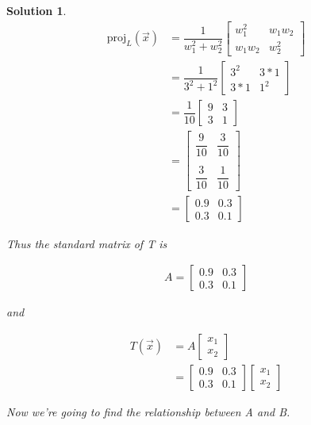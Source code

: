 \documentclass{article}
\newtheorem*{solution}{Solution}
\newcommand{\Proj}[2]{\mathrm{proj}_{#1}(\vec{#2})}
\begin{document}
\begin{solution}
\begin{align*}
\Proj{L}{x} &= \dfrac{1}{w_{1}^2 + w_{2}^2} \begin{bmatrix} w_{1}^2 & w_{1}w_{2} \\ w_{1}w_{2} & w_{2}^2 \end{bmatrix} \\
&= \dfrac{1}{3^2 + 1^2} \begin{bmatrix} 3^2 & 3*1 \\ 3*1 & 1^2 \end{bmatrix} \\
&= \dfrac{1}{10} \begin{bmatrix} 9 & 3 \\ 3 & 1 \end{bmatrix} \\
&= \begin{bmatrix} \dfrac{9}{10} & \dfrac{3}{10} \\ \\ \dfrac{3}{10} & \dfrac{1}{10} \end{bmatrix} \\
&= \begin{bmatrix} 0.9 & 0.3 \\ 0.3 & 0.1 \end{bmatrix}
\end{align*}

Thus the standard matrix of T is 

\begin{align*}
A = \begin{bmatrix} 0.9 & 0.3 \\ 0.3 & 0.1 \end{bmatrix}
\end{align*}

and 

\begin{align*}
T(\vec{x}) &= A \begin{bmatrix} x_{1} \\ x_{2} \end{bmatrix} \\
&= \begin{bmatrix} 0.9 & 0.3 \\ 0.3 & 0.1 \end{bmatrix} \begin{bmatrix} x_{1} \\ x_{2} \end{bmatrix}
\end{align*}

Now we're going to find the relationship between A and B. \\


\end{solution}
\end{document}
